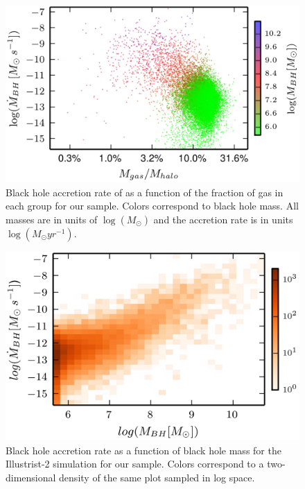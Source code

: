 \begin{figure}
\begin{centering}
\includegraphics{Figures/Mdot_vs_GasFrac}
\par\end{centering}

\protect\caption{\textbf{\label{fig:Mdot_vs_Mgas}}Black hole accretion rate of as
a function of the fraction of gas in each group for our sample. Colors
correspond to black hole mass. All masses are in units of $\log\left(M_{\odot}\right)$
and the accretion rate is in units $\log\left(M_{\odot}yr^{-1}\right)$.}


\end{figure}
\begin{figure}
\centering{}\includegraphics[clip]{Figures/Illustris2_bhpop_hist2d}\protect\caption{\label{fig:bhpop_hist2d}Black hole accretion rate as a function of
black hole mass for the Illustrist-2 simulation for our sample. Colors
correspond to a two-dimensional density of the same plot sampled in
log space.}
\end{figure}
